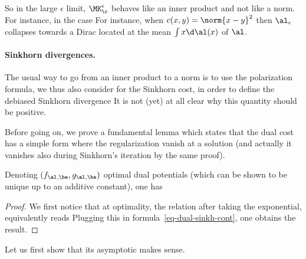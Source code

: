 So in the large $\epsilon$ limit, $\MK_\c^\epsilon$ behaves like an inner product and not like a norm. For instance, in the case 
For instance, when $c(x,y)=\norm{x-y}^2$ then $\al_\epsilon$ collapses towards a Dirac located at the mean $\int x \d\al(x)$ of $\al$.

\paragraph{Sinkhorn divergences.}

The usual way to go from an inner product to a norm is to use the polarization formula, we thus also consider for the Sinkhorn cost, in order to define the debiased Sinkhorn divergence
It is not (yet) at all clear why this quantity should be positive. 

Before going on, we prove a fundamental lemma which states that the dual cost has a simple form where the regularization vanish at a solution (and actually it vanishes also during Sinkhorn's iteration by the same proof).

\begin{lem}
	Denoting $(f_{\al,\be},g_{\al,\be})$ optimal dual potentials (which can be shown to be unique up to an additive constant), one has
\end{lem}
\begin{proof}
	We first notice that at optimality, the relation 
	after taking the exponential, equivalently reads
	Plugging this in formula~\eqref{eq-dual-sinkh-cont}, one obtains the result.
\end{proof}


%
Let us first show that its asymptotic makes sense.

